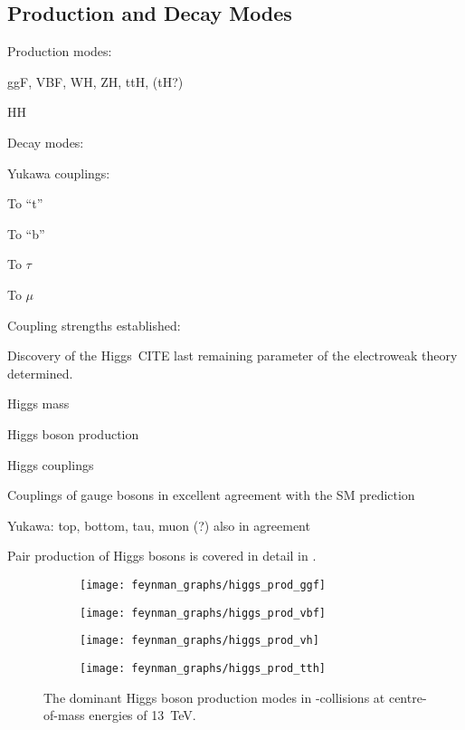 \subsection{Production and Decay Modes}






Production modes:

ggF, VBF, WH, ZH, ttH, (tH?)

HH

Decay modes:

Yukawa couplings:

To ``t''

To ``b''

To $\tau$

To $\mu$


Coupling strengths established:


Discovery of the Higgs~CITE last remaining parameter of the electroweak theory
determined.


Higgs mass

Higgs boson production

Higgs couplings


Couplings of gauge bosons in excellent agreement with the SM prediction

Yukawa: top, bottom, tau, muon (?) also in agreement







Pair production of Higgs bosons is covered in detail in
.


\begin{figure}[htbp]
  \centering

  \begin{subfigure}{0.45\textwidth}
    \centering
    \texttt{[image: feynman\_graphs/higgs\_prod\_ggf]}
  \end{subfigure}%
  \begin{subfigure}{0.45\textwidth}
    \centering
    \texttt{[image: feynman\_graphs/higgs\_prod\_vbf]}
  \end{subfigure}

  \vspace*{0.5em}

  \begin{subfigure}{0.45\textwidth}
    \centering
    \texttt{[image: feynman\_graphs/higgs\_prod\_vh]}
  \end{subfigure}%
  \begin{subfigure}{0.45\textwidth}
    \centering
    \texttt{[image: feynman\_graphs/higgs\_prod\_tth]}
  \end{subfigure}%

  \caption{The dominant Higgs boson production modes in \pp-collisions at
    centre-of-mass energies of \SI{13}{\TeV}.}%
  \label{fig:higgs_prod_feyn}
\end{figure}

